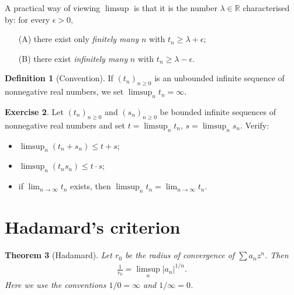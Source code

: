 \documentclass[11pt]{article}
\theoremstyle{plain}
\newtheorem{theorem}{Theorem}[section]
\theoremstyle{definition}
\newtheorem{definition}[theorem]{Definition}
\newtheorem{exercise}[theorem]{Exercise}
\theoremstyle{remark}
\numberwithin{equation}{section}
\newcommand{\be}{\begin{eqnarray}}
\newcommand{\ee}{\end{eqnarray}}
\newcommand{\R}{\mathbb{R}}
\begin{document}
A practical way of viewing $\limsup$ is that it is the number
$\lambda\in\R$ characterised by: for every $\epsilon>0$,
\begin{itemize}
\item[(A)] there exist only \emph{finitely many} $n$ with
$t_n\ge\lambda+\epsilon$;
\item[(B)] there exist \emph{infinitely many} $n$ with
$t_n\ge\lambda-\epsilon$.
\end{itemize}

\begin{definition}[Convention]
If $(t_n)_{n\geq0}$ is an unbounded infinite sequence of nonnegative real
numbers, we set $\limsup_n t_n=\infty$.
\end{definition}

\begin{exercise}
Let $(t_n)_{n\geq0}$ and $(s_n)_{n\geq0}$ be bounded infinite sequences of
nonnegative real numbers and set $t=\limsup_n t_n$, $s=\limsup_n s_n$. Verify:
\begin{itemize}
\item $\displaystyle\limsup_n(t_n+s_n)\le t+s$;
\item $\displaystyle\limsup_n(t_ns_n)\le t\cdot s$;
\item if $\displaystyle\lim_{n\to\infty}t_n$ exists, then
$\displaystyle\limsup_n t_n=\lim_{n\to\infty}t_n$.
\end{itemize}
\end{exercise}

\section{Hadamard's criterion}

\begin{theorem}[Hadamard]
\label{thm:hadamard}
Let $r_0$ be the radius of convergence of $\sum a_nz^n$. Then
\be
 \frac{1}{r_0}=\limsup_{n}|a_n|^{1/n}.
\ee
Here we use the conventions $1/0=\infty$ and $1/\infty=0$.
\end{theorem}
\end{document}
